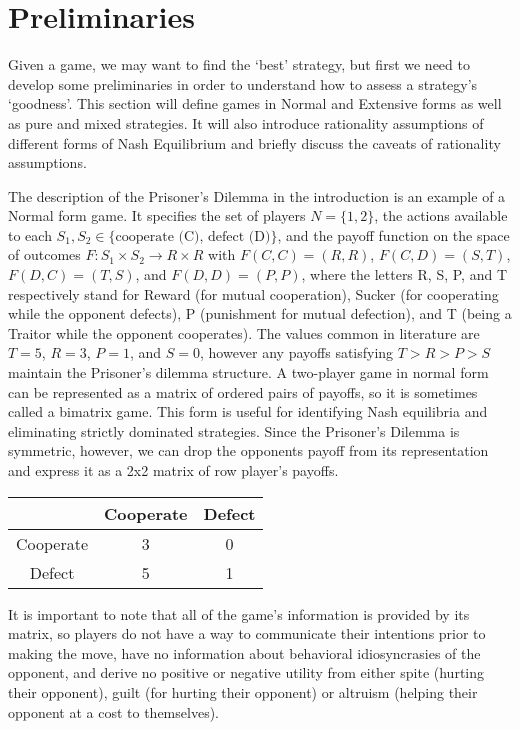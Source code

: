 \chapter{Preliminaries}

Given a game, we may want to find the `best' strategy, but first we need to develop some preliminaries in order to understand how to assess a strategy's `goodness'. This section will define games in Normal and Extensive forms as well as pure and mixed strategies. It will also introduce rationality assumptions of different forms of Nash Equilibrium and briefly discuss the caveats of rationality assumptions.

The description of the Prisoner's Dilemma in the introduction is an example of a Normal form game. It specifies the set of players $N = \{1, 2\}$, the actions available to each $S_1, S_2 \in \{\textrm{cooperate (C), defect (D)}\}$, and the payoff function on the space of outcomes $F \colon S_1 \times S_2 \rightarrow R\times R$ with $F(C,C) = (R, R)$, $F(C, D) = (S, T)$, $F(D, C) = (T,S)$, and $F(D, D) = (P, P)$, where the letters R, S, P, and T respectively stand for Reward (for mutual cooperation), Sucker (for cooperating while the opponent defects), P (punishment for mutual defection), and T (being a Traitor while the opponent cooperates). The values common in literature are $T = 5$, $R = 3$, $P = 1$, and $S = 0$, however any payoffs satisfying $T > R > P > S$ maintain the Prisoner's dilemma structure. A two-player game in normal form can be represented as a matrix of ordered pairs of payoffs, so it is sometimes called a bimatrix game. This form is useful for identifying Nash equilibria and eliminating strictly dominated strategies. Since the Prisoner's Dilemma is symmetric, however, we can drop the opponents payoff from its representation and express it as a 2x2 matrix of row player's payoffs.

\begin{center}
  \begin{tabular}{ | c | c | c | }
    \hline
    & Cooperate & Defect \\
    \hline
    Cooperate & 3 & 0 \\ \hline
    Defect & 5 & 1  \\ \hline
  \end{tabular}
\end{center}

It is important to note that all of the game's information is provided by its matrix, so players do not have a way to communicate their intentions prior to making the move, have no information about behavioral idiosyncrasies of the opponent, and derive no positive or negative utility from either spite (hurting their opponent), guilt (for hurting their opponent) or altruism (helping their opponent at a cost to themselves).

